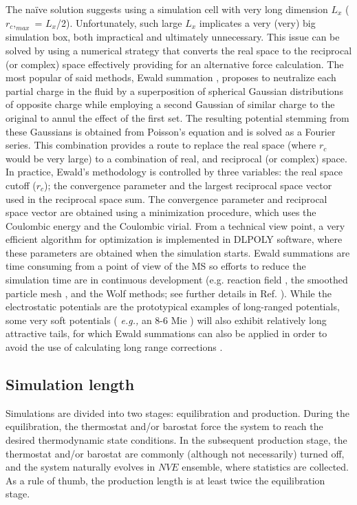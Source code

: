 \documentclass[9pt,bestpractices]{livecoms}
\begin{document}
The na\"{i}ve solution suggests using a simulation cell with very long
dimension $L_{x}$ ($r_{c},_{max}$ = $L_{x}$/2).
Unfortunately, such large $L_{x}$ implicates a very (very) big
simulation box, both impractical and ultimately unnecessary. This issue can
be solved by using a numerical strategy that converts the real space to
the reciprocal (or complex) space effectively providing for an alternative force
calculation.  The most popular of said methods, Ewald summation \citep{ewald1921},
proposes to neutralize
each partial charge in the fluid by a superposition of spherical Gaussian
distributions of opposite charge while employing a second Gaussian of similar
charge to the original to annul the effect of the first set. The resulting
potential stemming from these Gaussians is obtained from Poisson's equation and
is solved as a Fourier series. This combination provides a route to replace the
real space (where $r_{c}$ would be very large) to a combination of
real, and reciprocal (or complex) space. In practice, Ewald's methodology
is controlled by three variables: the real space cutoff ($r_{c}$); the
convergence parameter and the largest reciprocal space vector used in the
reciprocal space sum. The convergence parameter and reciprocal space vector are
obtained using a minimization procedure, which uses the Coulombic energy and
the Coulombic virial. From a technical view point, a very efficient algorithm
for optimization is implemented in DLPOLY software, where these parameters are
obtained when the simulation starts. Ewald summations are time consuming from
a point of view of the MS so efforts to reduce the simulation time are in
continuous development (e.g. reaction field \citep{barker1973,watts1974},
the smoothed particle mesh \citep{darden1993},
and the Wolf \citep{wolf1999} methods; see further details in Ref. \citep{allen2017}).
While the electrostatic potentials are the
prototypical examples of long-ranged potentials, some very soft potentials
( \textit{e.g.,} an 8-6 Mie ) will also exhibit relatively long attractive
tails, for which Ewald summations can also be applied in order to avoid the use
of calculating long range corrections \citep{kissel}.

\subsection{Simulation length} 
\label{sec:length}
Simulations are divided into two stages: equilibration and production. During
the equilibration, the thermostat and/or barostat force the system to reach the
desired thermodynamic state conditions. In the subsequent production stage, the
thermostat and/or barostat are commonly (although not necessarily) turned off,
and the system naturally evolves in $NVE$ ensemble, where statistics are
collected. As a rule of thumb, the production length is at least twice the
equilibration stage. 
\end{document}
